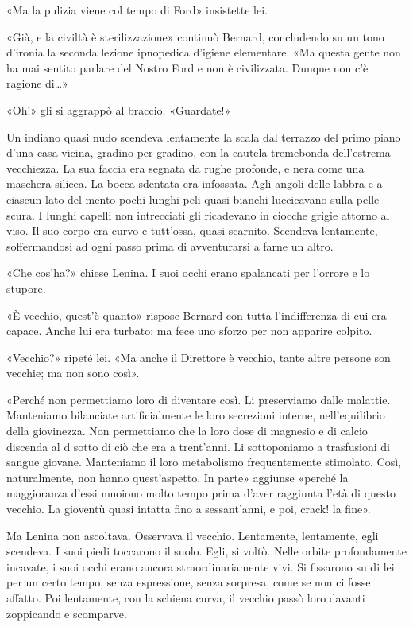 \documentclass[
a5paper, %
10pt, %
twoside, 
onecolumn, %
openany, %
]{memoir}
\begin{document}
«Ma la pulizia viene col tempo di Ford» insistette lei.

«Già, e la civiltà è sterilizzazione» continuò Bernard, concludendo su un tono d’ironia la seconda lezione ipnopedica d’igiene elementare. «Ma questa gente non ha mai sentito parlare del Nostro Ford e non è civilizzata. Dunque non c’è ragione di…»

«Oh!» gli si aggrappò al braccio. «Guardate!»

Un indiano quasi nudo scendeva lentamente la scala dal terrazzo del primo piano d’una casa vicina, gradino per gradino, con la cautela tremebonda dell’estrema vecchiezza. La sua faccia era segnata da rughe profonde, e nera come una maschera silicea. La bocca sdentata era infossata. Agli angoli delle labbra e a ciascun lato del mento pochi lunghi peli quasi bianchi luccicavano sulla pelle scura. I lunghi capelli non intrecciati gli ricadevano in ciocche grigie attorno al viso. Il suo corpo era curvo e tutt’ossa, quasi scarnito. Scendeva lentamente, soffermandosi ad ogni passo prima di avventurarsi a farne un altro.

«Che cos’ha?» chiese Lenina. I suoi occhi erano spalancati per l’orrore e lo stupore.

«È vecchio, quest’è quanto» rispose Bernard con tutta l’indifferenza di cui era capace. Anche lui era turbato; ma fece uno sforzo per non apparire colpito.

«Vecchio?» ripeté lei. «Ma anche il Direttore è vecchio, tante altre persone son vecchie; ma non sono così».

«Perché non permettiamo loro di diventare così. Li preserviamo dalle malattie. Manteniamo bilanciate artificialmente le loro secrezioni interne, nell’equilibrio della giovinezza. Non permettiamo che la loro dose di magnesio e di calcio discenda al d sotto di ciò che era a trent’anni. Li sottoponiamo a trasfusioni di sangue giovane. Manteniamo il loro metabolismo frequentemente stimolato. Così, naturalmente, non hanno quest’aspetto. In parte» aggiunse «perché la maggioranza d’essi muoiono molto tempo prima d’aver raggiunta l’età di questo vecchio. La gioventù quasi intatta fino a sessant’anni, e poi, crack! la fine».

Ma Lenina non ascoltava. Osservava il vecchio. Lentamente, lentamente, egli scendeva. I suoi piedi toccarono il suolo. Egli, si voltò. Nelle orbite profondamente incavate, i suoi occhi erano ancora straordinariamente vivi. Si fissarono su di lei per un certo tempo, senza espressione, senza sorpresa, come se non ci fosse affatto. Poi lentamente, con la schiena curva, il vecchio passò loro davanti zoppicando e scomparve.
\end{document}
